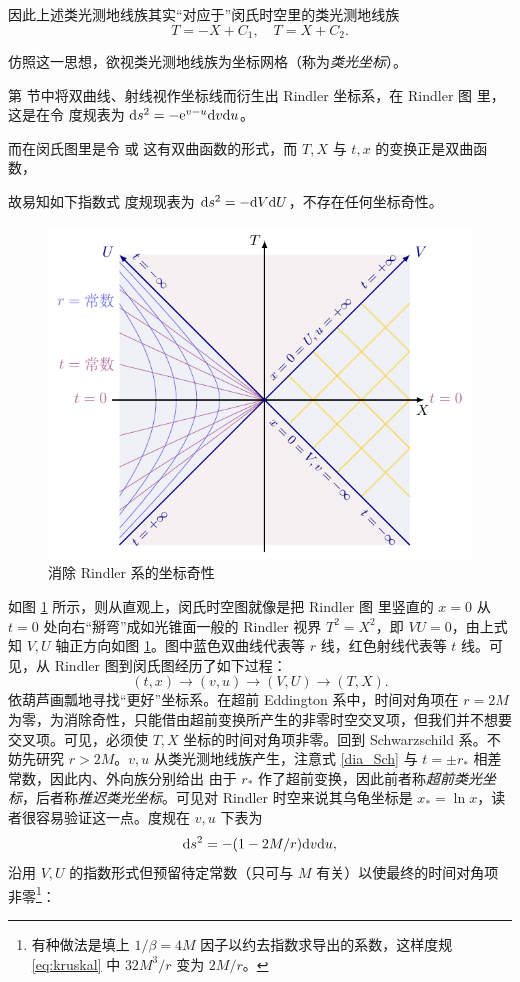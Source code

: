 因此上述类光测地线族其实“对应于”闵氏时空里的类光测地线族
\[
T=-X+C_1,\quad T=X+C_2.
\]

仿照这一思想，欲视类光测地线族为坐标网格（称为\textit{类光坐标}）。

第  节中将双曲线、射线视作坐标线而衍生出 Rindler 坐标系，在 Rindler 图  里，这是在令
度规表为 $\dd s^2=-\mathrm{e}^{v-u}\dd v\dd u$。

而在闵氏图里是令
或
这有双曲函数的形式，而 $T,X$ 与 $t,x$ 的变换正是双曲函数，

故易知如下指数式
度规现表为 $\dd s^2=-\dd V\dd U$，不存在任何坐标奇性。

\begin{figure}[h!]
    \centering
    \includegraphics[width=.6\textwidth]{fig/chpt02/rindler.pdf}
    \caption{消除 Rindler 系的坐标奇性}
    \label{fig:rindlerIM}
\end{figure}
如图 \ref{fig:rindlerIM} 所示，则从直观上，闵氏时空图就像是把 Rindler 图 里竖直的 $x=0$ 从 $t=0$ 处向右“掰弯”成如光锥面一般的 Rindler 视界 $T^2=X^2$，即 $VU=0$，由上式知 $V,U$ 轴正方向如图 \ref{fig:rindlerIM}。图中蓝色双曲线代表等 $r$ 线，红色射线代表等 $t$ 线。可见，从 Rindler 图到闵氏图经历了如下过程：
\[
(t,x)\to(v,u)\to(V,U)\to(T,X).
\]
依葫芦画瓢地寻找“更好”坐标系。在超前 Eddington 系中，时间对角项在 $r=2M$ 为零，为消除奇性，只能借由超前变换所产生的非零时空交叉项，但我们并不想要交叉项。可见，必须使 $T,X$ 坐标的时间对角项非零。回到 Schwarzschild 系。不妨先研究 $r>2M$。$v,u$ 从类光测地线族产生，注意式 \eqref{dia_Sch} 与 $t=\pm r_*$ 相差常数，因此内、外向族分别给出
由于 $r_*$ 作了超前变换，因此前者称\textit{超前类光坐标}，后者称\textit{推迟类光坐标}。可见对 Rindler 时空来说其乌龟坐标是 $x_*=\ln x$，读者很容易验证这一点。度规在 $v,u$ 下表为
\[
\dd s^2=-(1-2M/r)\dd v\dd u,
\]
沿用 $V,U$ 的指数形式但预留待定常数（只可与 $M$ 有关）以使最终的时间对角项非零\footnote{有种做法是填上 $1/\beta=4M$ 因子以约去指数求导出的系数，这样度规 \eqref{eq:kruskal} 中 ${32M^3}/{r}$ 变为 $2M/r$。}：
